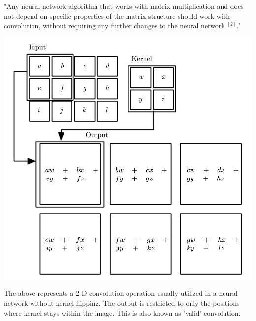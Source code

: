 \documentclass{article}
\begin{document}
"Any neural network algorithm that works with matrix multiplication and does not depend on specific properties of the matrix structure should work with convolution, without requiring any further changes to the neural network $^{[2]}$."
\begin{center}
	\includegraphics[scale=0.2]{convolution}
\end{center}
The above represents a 2-D convolution operation usually utilized in a neural network without kernel flipping. The output is restricted to only the positions where kernel stays within the image. This is also known as 'valid' convolution. 
\end{document}
